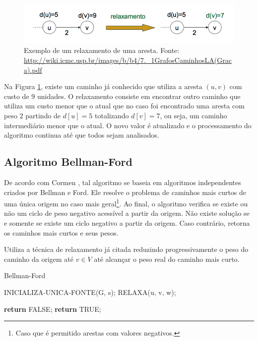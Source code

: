 \documentclass[12pt]{article}
\begin{document}
\begin{figure}[H]
  \centering
    \includegraphics[width=1\textwidth]{img/relaxamento.png}
  \caption{Exemplo de um relaxamento de uma aresta. Fonte: \protect\url{http://wiki.icmc.usp.br/images/b/b4/7._1GrafosCaminhosLA(Graca).pdf}}
  \label{fig:relaxamento}
\end{figure}

Na Figura \ref{fig:relaxamento}, existe um caminho já conhecido que utiliza a aresta $(u,v)$ com custo de 9 unidades. O relaxamento consiste em encontrar outro caminho que utiliza um custo menor que o atual que no caso foi encontrado uma aresta com peso $2$ partindo de $d[u]=5$ totalizando $d[v]=7$, ou seja, um caminho intermediário menor que o atual. O novo valor é atualizado e o processamento do algoritmo continua até que todos sejam analisados.

\subsection{Algoritmo Bellman-Ford}

De acordo com Cormen \cite{cormen2002algoritmos}, tal algoritmo se baseia em algoritmos independentes criados por Bellman e Ford. Ele resolve o problema de caminhos mais curtos de uma única origem no caso mais geral\footnote{Caso que é permitido arestas com valores negativos.}. Ao final, o algoritmo verifica se existe ou não um ciclo de peso negativo acessível a partir da origem. Não existe solução se e somente se existe um ciclo negativo a partir da origem. Caso contrário, retorna os caminhos mais curtos e seus pesos.

Utiliza a técnica de relaxamento já citada reduzindo progressivamente o peso do caminho da origem até $v \in V$ até alcançar o peso real do caminho mais curto.


\begin{algorithm}[H]
\caption{Bellman-Ford}\label{alg:d}
\begin{algorithmic}[1]
	\State INICIALIZA-UNICA-FONTE(G, s);
	      \State RELAXA(u, v, w);
      \EndFor
    \EndFor
    
	      \State \textbf{return} FALSE;
      \EndIf
    \EndFor
    \State \textbf{return} TRUE;
\EndProcedure
\end{algorithmic}
\end{algorithm}
\end{document}
